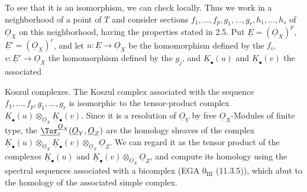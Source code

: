To see that it is an isomorphism, we can check locally. Thus we work in a neighborhood of a point of \(T\) and consider sections \(f_1,\ldots,f_p,g_1,\ldots,g_r,h_1,\ldots,h_s\) of \(\underline{O}_X\) on this neighborhood, having the properties stated in 2.5. Put \(\underline{E}=(\underline{O}_X)^p\), \(\underline{E}'=(\underline{O}_X)^r\), and let \(u:\underline{E}\to\underline{O}_X\) be the homomorphism defined by the \(f_i\), \(v:\underline{E}'\to\underline{O}_X\) the homomorphism defined by the \(g_j\), and \(\underline{K}_\bullet(u)\) and \(\underline{K}_\bullet(v)\) the associated

%
Koszul complexes. The Koszul complex associated with the sequence \(f_1,\ldots,f_p,g_1,\ldots,g_r\) is isomorphic to the tensor-product complex \(\underline{K}_\bullet(u)\otimes_{\underline{O}_X}\underline{K}_\bullet(v)\). Since it is a resolution of \(\underline{O}_Y\) by free \(\underline{O}_X\)-Modules of finite type, the \(\underline{\Tor}_i^{\underline{O}_X}(\underline{O}_Y,\underline{O}_Z)\) are the homology sheaves of the complex \(\underline{K}_\bullet(u)\otimes_{\underline{O}_X}\underline{K}_\bullet(v)\otimes_{\underline{O}_X}\underline{O}_Z\). We can regard it as the tensor product of the complexes \(\underline{K}_\bullet(u)\) and \(\underline{K}_\bullet(v)\otimes_{\underline{O}_X}\underline{O}_Z\), and compute its homology using the spectral sequences associated with a bicomplex (EGA \(0_{\mathrm{III}}\) (11.3.5)), which abut to the homology of the associated simple complex.

